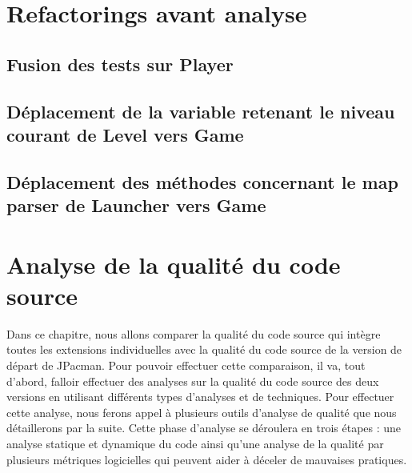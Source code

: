 \documentclass[12pt, openany]{report}
\begin{document}
\section{Refactorings avant analyse}

\subsection{Fusion des tests sur \og Player \fg}
\subsection{Déplacement de la variable retenant le niveau courant de \og Level \fg vers \og Game \fg}
\subsection{Déplacement des méthodes concernant le \og map parser \fg de \og Launcher \fg vers \og Game \fg}









\section{Analyse de la qualité du code source}

Dans ce chapitre, nous allons comparer la qualité du code source qui intègre toutes les extensions individuelles avec la qualité du code source de la version de départ de JPacman. Pour pouvoir effectuer cette comparaison, il va, tout d'abord, falloir effectuer des analyses sur la qualité du code source des deux versions en utilisant différents types d'analyses et de techniques. Pour effectuer cette analyse, nous ferons appel à plusieurs outils d'analyse de qualité que nous détaillerons par la suite. Cette phase d'analyse se déroulera en trois étapes : une analyse statique et dynamique du code ainsi qu'une analyse de la qualité par plusieurs métriques logicielles qui peuvent aider à déceler de mauvaises pratiques. 
\end{document}
